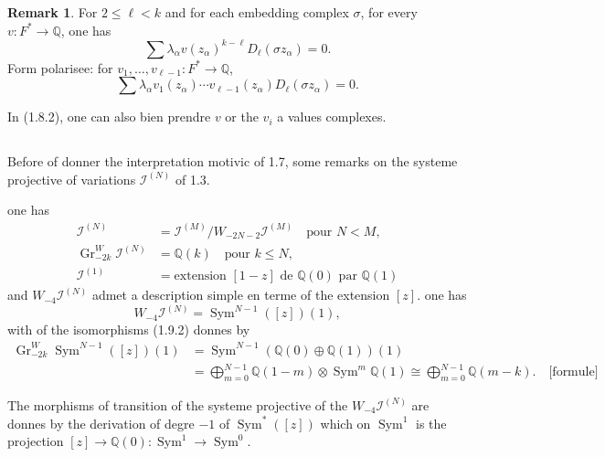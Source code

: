 \documentclass[12pt,a4paper]{article}
\theoremstyle{plain}
\theoremstyle{definition}
\newtheorem{remark}{Remark}[section]
\theoremstyle{remark}
\DeclareMathOperator{\Sym}{Sym}
\newcommand{\Q}{\mathbb{Q}}
\begin{document}
{\begin{remark}
For $2\leq\ell<k$ and for each embedding complex $\sigma$, for every $v:F^*\to\Q$, one has
\begin{equation}\label{eq:1.8.2}
\sum\lambda_\alpha v(z_\alpha)^{k-\ell}D_\ell(\sigma z_\alpha)=0.\tag{1.8.2}
\end{equation}
Form polaris{e}e: for $v_1,\ldots,v_{\ell-1}:F^*\to\Q$,
\begin{equation*}
\sum\lambda_\alpha v_1(z_\alpha)\cdots v_{\ell-1}(z_\alpha)D_\ell(\sigma z_\alpha)=0.
\end{equation*}

In (1.8.2), one can also bien prendre $v$ or the $v_i$ {a} values complexes.
\end{remark}

\subsection{}

Before of donner the interpr{e}tation motivic of 1.7, some remarks on the syst{e}me projective of variations $\mathcal{I}^{(N)}$ of 1.3.

one has
\begin{align}
\mathcal{I}^{(N)} &= \mathcal{I}^{(M)}/W_{-2N-2}\mathcal{I}^{(M)} \quad \text{pour }N<M, \tag{1.9.1}\label{eq:1.9.1}\\
\operatorname{Gr}^W_{-2k}\mathcal{I}^{(N)} &= \Q(k) \quad \text{pour }k\leq N, \tag{1.9.2}\label{eq:1.9.2}\\
\mathcal{I}^{(1)} &= \text{extension }[1-z]\text{ de }\Q(0)\text{ par }\Q(1) \tag{1.9.3}\label{eq:1.9.3}
\end{align}
and $W_{-4}\mathcal{I}^{(N)}$ admet a description simple en terme of the extension $[z]$. one has
\begin{equation*}
W_{-4}\mathcal{I}^{(N)} = \Sym^{N-1}([z])(1),
\end{equation*}
with of the isomorphisms (1.9.2) donn{e}s by
\begin{equation}\label{eq:1.9.4}
\begin{aligned}
\operatorname{Gr}^W_{-2k}\Sym^{N-1}([z])(1) &= \Sym^{N-1}(\Q(0)\oplus\Q(1))(1)\\
&= \bigoplus_{m=0}^{N-1}\Q(1-m)\otimes\Sym^m\Q(1) \cong \bigoplus_{m=0}^{N-1}\Q(m-k).\quad \text{[formule]}
\end{aligned}
\tag{1.9.4}
\end{equation}

The morphisms of transition of the syst{e}me projective of the $W_{-4}\mathcal{I}^{(N)}$ are donn{e}s by the d{e}rivation of degr{e} $-1$ of $\Sym^*([z])$ which on $\Sym^1$ is the projection $[z]\to\Q(0):\Sym^1\to\Sym^0$.

}
\end{document}
